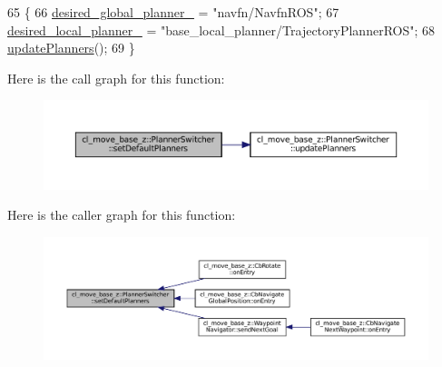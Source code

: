 \begin{DoxyCode}
65 \{
66   \hyperlink{classcl__move__base__z_1_1PlannerSwitcher_aef047d3778b2993c1df146bbad43e03d}{desired\_global\_planner\_} = \textcolor{stringliteral}{"navfn/NavfnROS"};
67   \hyperlink{classcl__move__base__z_1_1PlannerSwitcher_a6cbf65f11bb69125f913caaabdf7b4cf}{desired\_local\_planner\_} = \textcolor{stringliteral}{"base\_local\_planner/TrajectoryPlannerROS"};
68   \hyperlink{classcl__move__base__z_1_1PlannerSwitcher_a146641f63aea3185daab4c5cbb789550}{updatePlanners}();
69 \}
\end{DoxyCode}
Here is the call graph for this function\+:
\nopagebreak
\begin{figure}[H]
\begin{center}
\leavevmode
\includegraphics[width=350pt]{classcl__move__base__z_1_1PlannerSwitcher_ad3f0d08a51af6218d203bf44a7f9df40_cgraph}
\end{center}
\end{figure}
Here is the caller graph for this function\+:
\nopagebreak
\begin{figure}[H]
\begin{center}
\leavevmode
\includegraphics[width=350pt]{classcl__move__base__z_1_1PlannerSwitcher_ad3f0d08a51af6218d203bf44a7f9df40_icgraph}
\end{center}
\end{figure}
\mbox{\label{classcl__move__base__z_1_1PlannerSwitcher_a4bec9859c90f125f9fcc2b68594caf17}} 
